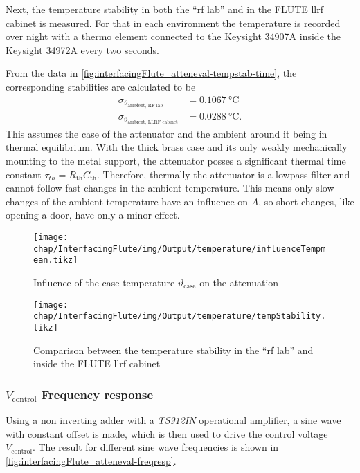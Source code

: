 Next, the temperature stability in both the ``\gls{rf} lab'' and in the FLUTE \gls{llrf} cabinet is measured. For that in each environment the temperature is recorded over night with a thermo element connected to the Keysight 34907A inside the Keysight 34972A every two seconds.

From the data in \autoref{fig:interfacingFlute_atteneval-tempstab-time}, the corresponding stabilities are calculated to be
\begin{align}
\sigma_{\vartheta_\text{ambient, RF lab}}       &= \SI{0.1067}{\celsius}\\
\sigma_{\vartheta_\text{ambient, LLRF cabinet}} &= \SI{0.0288}{\celsius}.
\end{align}
This assumes the case of the attenuator and the ambient around it being in thermal equilibrium. With the thick brass case and its only weakly mechanically mounting to the metal support, the attenuator posses a significant thermal time constant $\tau_{th}=R_\text{th}C_\text{th}$. Therefore, thermally the attenuator is a lowpass filter and cannot follow fast changes in the ambient temperature.
This means only slow changes of the ambient temperature have an influence on $A$, so short changes, like opening a door, have only a minor effect.

\begin{figure}[H]
	\centering
	\texttt{[image: chap/InterfacingFlute/img/Output/temperature/influenceTempmean.tikz]}
	\caption[Processed data from \autoref{fig:interfacingFlute_atteneval-tempstab-influence}]{Influence of the case temperature $\vartheta_\text{case}$ on the attenuation}
	\label{fig:interfacingFlute_atteneval-tempstab-influenceMean}
\end{figure}

\begin{figure}[H]
	\centering
	\texttt{[image: chap/InterfacingFlute/img/Output/temperature/tempStability.tikz]}
	\caption[Measured temperature stability]{Comparison between the temperature stability in the ``\gls{rf} lab'' and inside the FLUTE \gls{llrf} cabinet}
	\label{fig:interfacingFlute_atteneval-tempstab-time}
\end{figure}

\newpage
\subsubsection{$V_\text{control}$ Frequency response}\label{sec:interfacingFlute_freqr}
Using a non inverting adder with a \textit{TS912IN} operational amplifier, a sine wave with constant offset is made, which is then used to drive the control voltage $V_\text{control}$. The result for different sine wave frequencies is shown in \autoref{fig:interfacingFlute_atteneval-freqresp}.

